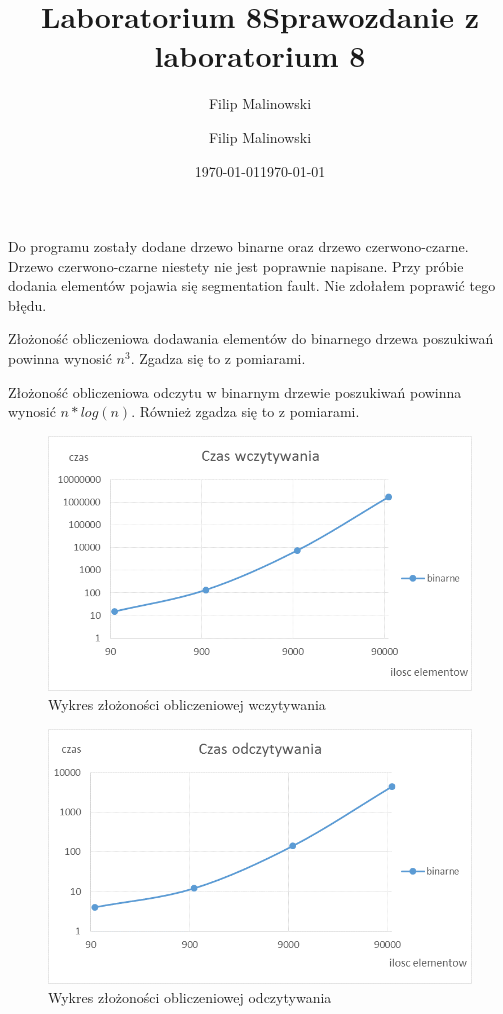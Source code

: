 \documentclass[a4paper,10pt]{scrartcl}
\title{Laboratorium 8}
\author{Filip Malinowski}
\date{\today}
\begin{document}
\title{Sprawozdanie z laboratorium 8}
\author{Filip Malinowski}
\date{\today}

\maketitle

Do programu zostały dodane drzewo binarne oraz
drzewo czerwono-czarne.
Drzewo czerwono-czarne niestety nie jest poprawnie
napisane. Przy próbie dodania elementów pojawia się
segmentation fault. Nie zdołałem poprawić tego błędu.

Złożoność obliczeniowa dodawania elementów do
binarnego drzewa poszukiwań powinna wynosić
\begin{math}
  n^{3}.
\end{math}
Zgadza się to z pomiarami.

Złożoność obliczeniowa odczytu w binarnym
drzewie poszukiwań powinna wynosić
\begin{math}
 n*log(n).
\end{math}
Również zgadza się to z pomiarami.

\pagebreak

\begin{landscape}
\begin{figure}
 \centering
 \includegraphics{wczytywanie}
 \caption{Wykres złożoności obliczeniowej wczytywania}
\end{figure}

\begin{figure}
 \centering
 \includegraphics{odczytywanie}
 \caption{Wykres złożoności obliczeniowej odczytywania}
\end{figure}

\end{landscape}
\end{document}
